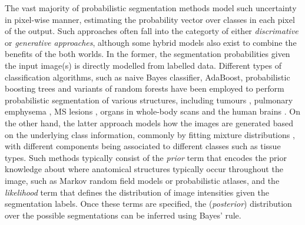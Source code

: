 The vast majority of probabilistic segmentation methods model such uncertainty in pixel-wise manner, estimating the probability vector over classes in each pixel of the output. Such approaches often fall into the categorty of either \textit{discrimative} or \textit{generative approaches}, although some hybrid models also exist \cite{heckemann2006automatic,tu2008brain,iglesias2011combining,criminisi2011discriminative,menze2015generative} to combine the benefits of the both worlds. In the former,  the segmentation probabilities given the input image(s) is directly modelled from labelled data. Different types of classification algorithms, such as naive Bayes classifier, AdaBoost, probabilistic boosting trees and variants of random forests have been employed to perform probabilistic segmentation of various structures, including tumours \cite{wels2008discriminative,le2016lifted}, pulmonary emphysema  \cite{prasad2008multi}, MS lesions \cite{geremia2011spatial}, organs in whole-body scans \cite{criminisi2009decision,montillo2011entangled} and the human brains \cite{morra2008automatic,wang2015links}. On the other hand, the latter approach models how the images are generated based on the underlying class information, commonly by fitting mixture distributions \cite{lei1992statistical,liang1994parameter,wells1996adaptive,van1999automated,zhang2001segmentation,wyatt2003map,ashburner2005unified}, with different components being associated to different classes such as tissue types. Such methods typically consist of the \textit{prior} term that encodes the prior knowledge about where anatomical structures typically occur throughout the image, such as Markov random field models or probabilistic atlases, and the \textit{likelihood} term that defines the distribution of image intensities given the segmentation labels. Once these terms are specified, the (\textit{posterior}) distribution over the possible segmentations can be inferred using Bayes’ rule. 


